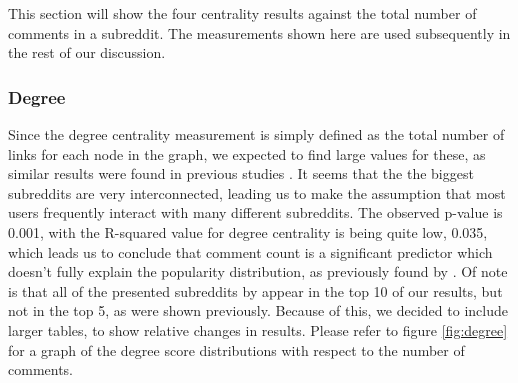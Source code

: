 \documentclass[bsc,frontabs,twoside,singlespacing,parskip,deptreport]{infthesis}
\begin{document}
This section will show the four centrality results against the total number of comments in a subreddit. The measurements shown here are used subsequently in the rest of our discussion.

\subsubsection{Degree}

Since the degree centrality measurement is simply defined as the total number of links for each node in the graph, we expected to find large values for these,  as similar results were found in previous studies \cite{steinbauer}. It seems that the the biggest subreddits are very interconnected, leading us to make the assumption that most users frequently interact with many different subreddits. The observed p-value is 0.001, with the R-squared value for degree centrality is being quite low, 0.035, which leads us to conclude that comment count is a significant predictor which doesn't fully explain the popularity distribution, as previously found by \cite{masters}. Of note is that all of the presented subreddits by \cite{masters} appear in the top 10 of our results, but not in the top 5, as were shown previously. Because of this, we decided to include larger tables, to show relative changes in results. Please refer to figure \ref{fig:degree} for a graph of the degree score distributions with respect to the number of comments. 

\begin{table}[!h]
\centering
{}
\caption{Top 10 subreddits ordered by their degree score}
\label{top-degree}
\end{table}
\end{document}
